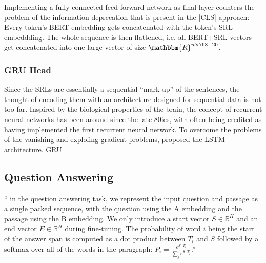 Implementing a fully-connected feed forward network as final layer counters the problem of the
information deprecation that is present in the [CLS] approach: Every token's BERT embedding gets
concatenated with the token's SRL embeddding. The whole sequence is then flattened, i.e. all
BERT+SRL vectors get concatenated into one large vector of size $\mathbbm{R}^{n\times768+20}$.


\subsubsection{GRU Head}

Since the SRLs are essentially a sequential ``mark-up'' of the sentences, the thought of
encoding them with an architecture designed for sequential data is not too far. Inspired by
the biological properties of the brain, the concept of recurrent neural networks has been
around since the late 80ies, with \citep{hopfield1982neural} often being credited as having
implemented the first recurrent neural network. To overcome the problems of the vanishing
and explofing gradient problems, \citep{hochreiter1997long} proposed the LSTM architecture.
\citep{cho2014learning} GRU






\subsection{Question Answering}
\label{sec:question-answering}



``\textelp{} in the question answering task, we represent the input question and passage as
a single packed sequence, with the question using the A embedding and the passage using the
B embedding. We only introduce a start vector $S \in \mathbb{R}^H$ and an end vector $E \in
\mathbb{R}^H$ during fine-tuning. The probability of word $i$ being the start of the answer
span is computed as a dot product between $T_i$ and $S$ followed by a softmax over all of the
words in the paragraph: $P_i = \frac{e^{S\cdot T_i}}{\sum_{j}^{} e^{S\cdot T_j}}$.'' \citep{devlin2018bert}


